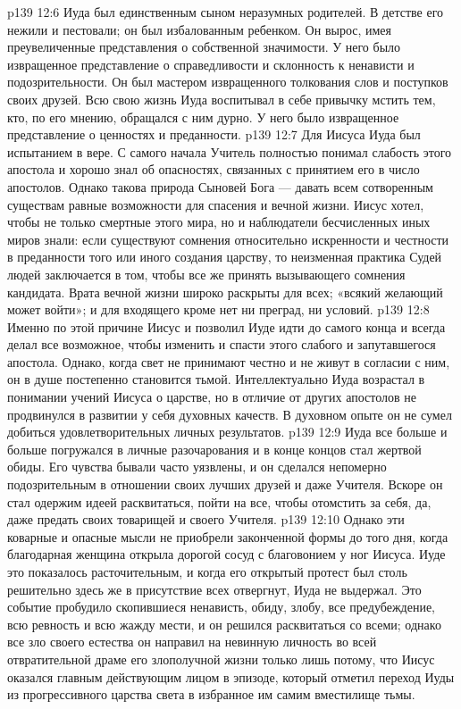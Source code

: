 \vs p139 12:6 Иуда был единственным сыном неразумных родителей. В детстве его нежили и пестовали; он был избалованным ребенком. Он вырос, имея преувеличенные представления о собственной значимости. У него было извращенное представление о справедливости и склонность к ненависти и подозрительности. Он был мастером извращенного толкования слов и поступков своих друзей. Всю свою жизнь Иуда воспитывал в себе привычку мстить тем, кто, по его мнению, обращался с ним дурно. У него было извращенное представление о ценностях и преданности.
\vs p139 12:7 \pc Для Иисуса Иуда был испытанием в вере. С самого начала Учитель полностью понимал слабость этого апостола и хорошо знал об опасностях, связанных с принятием его в число апостолов. Однако такова природа Сыновей Бога --- давать всем сотворенным существам равные возможности для спасения и вечной жизни. Иисус хотел, чтобы не только смертные этого мира, но и наблюдатели бесчисленных иных миров знали: если существуют сомнения относительно искренности и честности в преданности того или иного создания царству, то неизменная практика Судей людей заключается в том, чтобы все же принять вызывающего сомнения кандидата. Врата вечной жизни широко раскрыты для всех; «всякий желающий может войти»; и для входящего кроме  нет ни преград, ни условий.
\vs p139 12:8 Именно по этой причине Иисус и позволил Иуде идти до самого конца и всегда делал все возможное, чтобы изменить и спасти этого слабого и запутавшегося апостола. Однако, когда свет не принимают честно и не живут в согласии с ним, он в душе постепенно становится тьмой. Интеллектуально Иуда возрастал в понимании учений Иисуса о царстве, но в отличие от других апостолов не продвинулся в развитии у себя духовных качеств. В духовном опыте он не сумел добиться удовлетворительных личных результатов.
\vs p139 12:9 \pc Иуда все больше и больше погружался в личные разочарования и в конце концов стал жертвой обиды. Его чувства бывали часто уязвлены, и он сделался непомерно подозрительным в отношении своих лучших друзей и даже Учителя. Вскоре он стал одержим идеей расквитаться, пойти на все, чтобы отомстить за себя, да, даже предать своих товарищей и своего Учителя.
\vs p139 12:10 Однако эти коварные и опасные мысли не приобрели законченной формы до того дня, когда благодарная женщина открыла дорогой сосуд с благовонием у ног Иисуса. Иуде это показалось расточительным, и когда его открытый протест был столь решительно здесь же в присутствие всех отвергнут, Иуда не выдержал. Это событие пробудило скопившиеся ненависть, обиду, злобу, все предубеждение, всю ревность и всю жажду мести, и он решился расквитаться со всеми; однако все зло своего естества он направил на невинную личность во всей отвратительной драме его злополучной жизни только лишь потому, что Иисус оказался главным действующим лицом в эпизоде, который отметил переход Иуды из прогрессивного царства света в избранное им самим вместилище тьмы.
